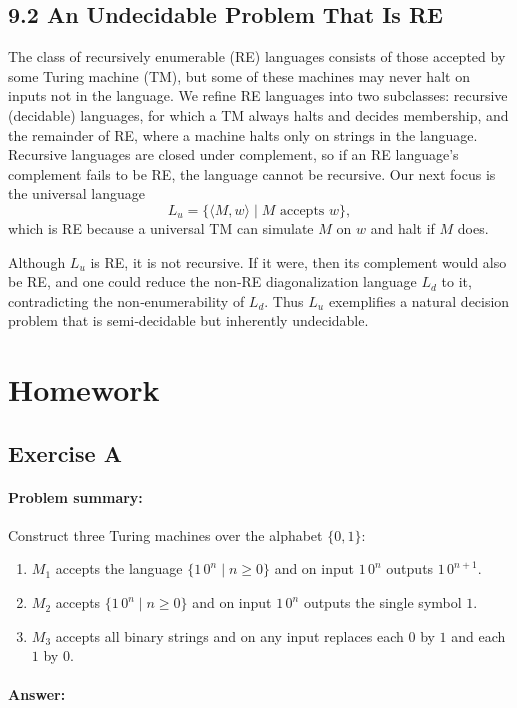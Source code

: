 \documentclass{article}
\begin{document}
\subsection*{9.2 An Undecidable Problem That Is RE}
The class of recursively enumerable (RE) languages consists of those accepted by some Turing machine (TM), but some of these machines may never halt on inputs not in the language. We refine RE languages into two subclasses: recursive (decidable) languages, for which a TM always halts and decides membership, and the remainder of RE, where a machine halts only on strings in the language. Recursive languages are closed under complement, so if an RE language’s complement fails to be RE, the language cannot be recursive. Our next focus is the universal language
\[
L_{u} = \{\langle M,w\rangle \mid M \mbox{ accepts } w\},
\]
which is RE because a universal TM can simulate \(M\) on \(w\) and halt if \(M\) does.

Although \(L_{u}\) is RE, it is not recursive. If it were, then its complement would also be RE, and one could reduce the non‑RE diagonalization language \(L_{d}\) to it, contradicting the non‑enumerability of \(L_{d}\). Thus \(L_{u}\) exemplifies a natural decision problem that is semi‑decidable but inherently undecidable.


\section{Homework}
\subsection*{Exercise A}
\paragraph{Problem summary:}  
Construct three Turing machines over the alphabet \(\{0,1\}\):
\begin{enumerate}
  \item \(M_1\) accepts the language \(\{1\,0^n \mid n\ge0\}\) and on input \(1\,0^n\) outputs \(1\,0^{n+1}\).
  \item \(M_2\) accepts \(\{1\,0^n \mid n\ge0\}\) and on input \(1\,0^n\) outputs the single symbol \(1\).
  \item \(M_3\) accepts all binary strings and on any input replaces each \(0\) by \(1\) and each \(1\) by \(0\).
\end{enumerate}

\paragraph{Answer:}
\end{document}
